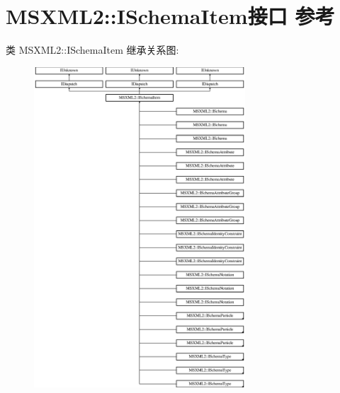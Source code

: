 \hypertarget{interface_m_s_x_m_l2_1_1_i_schema_item}{}\section{M\+S\+X\+M\+L2\+:\+:I\+Schema\+Item接口 参考}
\label{interface_m_s_x_m_l2_1_1_i_schema_item}
类 M\+S\+X\+M\+L2\+:\+:I\+Schema\+Item 继承关系图\+:\begin{figure}[H]
\begin{center}
\leavevmode
\includegraphics[height=12.000000cm]{interface_m_s_x_m_l2_1_1_i_schema_item}
\end{center}
\end{figure}
